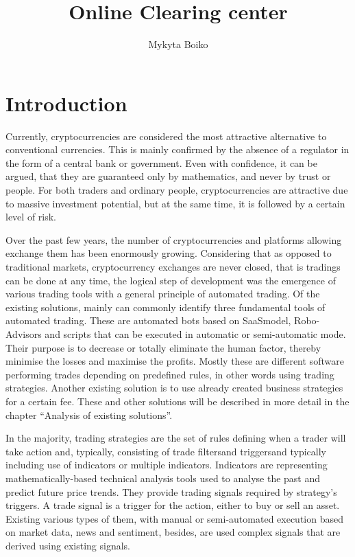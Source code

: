 \documentclass[thesis=B,english]{FITthesis}[2019/03/06]
\title{Online Clearing center}
\author{Mykyta Boiko} %
\begin{document}

\chapter{Introduction}
Currently, cryptocurrencies are considered the most attractive alternative to conventional currencies. This is mainly confirmed by the absence of a regulator in the form of a central bank or government. Even with confidence, it can be argued, that they are guaranteed only by mathematics, and never by trust or people.
For both traders and ordinary people, cryptocurrencies are attractive due to massive investment potential, but at the same time, it is followed by a certain level of risk.

Over the past few years, the number of cryptocurrencies and platforms allowing exchange them has been enormously growing.  Considering that as opposed to traditional markets, cryptocurrency exchanges are never closed, that is tradings can be done at any time, the logical step of development was the emergence of various trading tools with a general principle of automated trading. Of the existing solutions, mainly can commonly identify three fundamental tools of automated trading. These are automated bots based on SaaS\footnotemark model, Robo-Advisors and scripts that can be executed in automatic or semi-automatic mode. Their purpose is to decrease or totally eliminate the human factor, thereby minimise the losses and maximise the profits. Mostly these are different software performing trades depending on predefined rules, in other words using trading strategies. Another existing solution is to use already created business strategies for a certain fee. These and other solutions will be described in more detail in the chapter “Analysis of existing solutions”.


In the majority, trading strategies are the set of rules defining when a trader will take action and, typically, consisting of trade filters\footnotemark and triggers\footnotemark and typically including use of indicators or multiple indicators. Indicators are representing mathematically-based technical analysis tools used to analyse the past and predict future price trends. They provide trading signals required by strategy's triggers. A trade signal is a trigger for the action, either to buy or sell an asset. Existing various types of them, with manual or semi-automated execution based on market data, news and sentiment, besides, are used complex signals that are derived using existing signals.  
\end{document}
